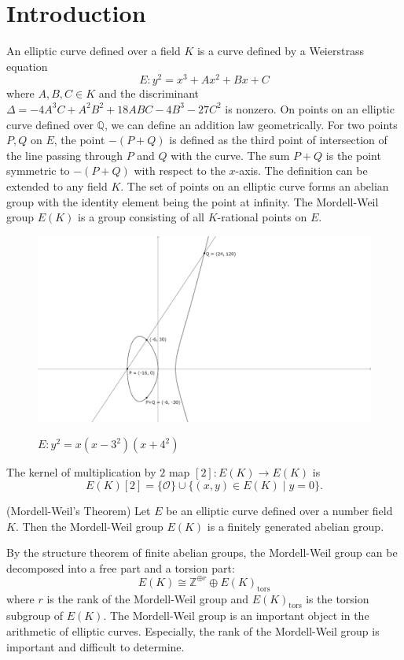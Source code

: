 \documentclass[main]{subfiles}
\begin{document}
\section{Introduction}

An elliptic curve defined over a field $K$ is a curve defined by a Weierstrass equation
\begin{equation*}
    E: y^{2} = x^{3} + Ax^2 + Bx + C
\end{equation*}
where $A,B,C \in K$ and the discriminant $\Delta = -4A^3C + A^2B^2 + 18ABC - 4B^3 - 27C^2$ is nonzero.
On points on an elliptic curve defined over $\mathbb{Q}$, we can define an addition law geometrically.
For two points $P,Q$ on $E$, the point $-(P+Q)$ is defined as the third point of intersection of the line passing through $P$ and $Q$ with the curve.
The sum $P+Q$ is the point symmetric to $-(P+Q)$ with respect to the $x$-axis.
The definition can be extended to any field $K$.
The set of points on an elliptic curve forms an abelian group with the identity element being the point at infinity.
The Mordell-Weil group $E(K)$ is a group consisting of all $K$-rational points on $E$.
\begin{figure}[H]
    \centering
    \caption{$E: y^2 = x(x-3^2)(x+4^2)$}
    \includegraphics[keepaspectratio, width=0.7\linewidth]{figures/3-4-5.png}
    \label{fig:elliptic_curve}
\end{figure}

\begin{thm}
    The kernel of multiplication by $2$ map $[2]: E(K) \to E(K)$ is
    \begin{equation*}
        E(K)[2] = \{ \mathcal{O} \} \cup \{ (x,y) \in E(K) \mid y = 0 \}.
    \end{equation*}
\end{thm}

\begin{thm}{(Mordell-Weil's Theorem)}
    \label{thm:mordell}
    Let $E$ be an elliptic curve defined over a number field $K$.
    Then the Mordell-Weil group $E(K)$ is a finitely generated abelian group.
\end{thm}
By the structure theorem of finite abelian groups, the Mordell-Weil group can be decomposed into a free part and a torsion part:
\begin{equation*}
    E(K) \cong \mathbb{Z}^{\oplus r} \oplus E(K)_{\text{tors}}
\end{equation*}
where $r$ is the rank of the Mordell-Weil group and $E(K)_{\text{tors}}$ is the torsion subgroup of $E(K)$.
The Mordell-Weil group is an important object in the arithmetic of elliptic curves.
Especially, the rank of the Mordell-Weil group is important and difficult to determine.
\end{document}
